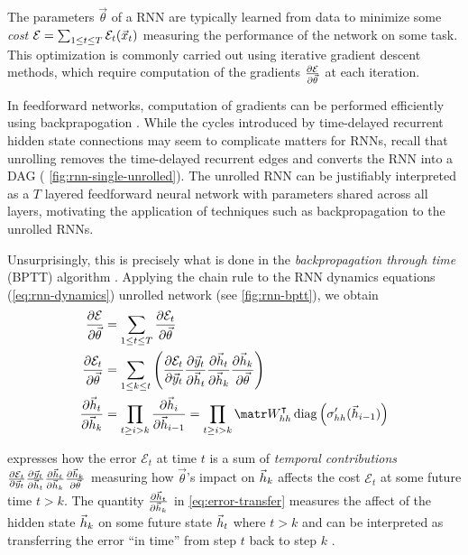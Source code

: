 
The parameters $\vec{\theta}$ of a RNN are typically learned from data to
minimize some \emph{cost} $\mathcal{E} = \sum_{1 \leq t \leq T} \mathcal{E}_t(\vec{x}_t)$
measuring the performance of the network on some task. This optimization is
commonly carried out using iterative gradient descent methods, which require
computation of the gradients $\frac{\partial \mathcal{E}}{\partial \vec{\theta}}$ at each
iteration.

In feedforward networks, computation of gradients can be performed efficiently
using backprapogation
\citep{bryson1963optimal,linnainmaa1970representation,rumelhart1988learning}.
While the cycles introduced by time-delayed recurrent hidden state connections
may seem to complicate matters for RNNs, recall that unrolling removes the
time-delayed recurrent edges and converts the RNN into a DAG (\eg
\vref{fig:rnn-single-unrolled}). The unrolled RNN can be justifiably
interpreted as a $T$ layered feedforward neural network with parameters shared
across all layers, motivating the application of techniques such as
backpropagation to the unrolled RNNs.

Unsurprisingly, this is precisely what is done in the \emph{backpropagation
through time} (BPTT) algorithm \citep{goller1996learning}. Applying the
chain rule to the RNN dynamics equations (\vref{eq:rnn-dynamics})
unrolled network (see \cref{fig:rnn-bptt}), we obtain
\begin{align}
  \frac{\pd \mathcal{E}}{\pd \vec{\theta}} &= \sum_{1 \leq t \leq T} \frac{\pd \mathcal{E}_t}{\pd \vec{\theta}} \label{eq:err-total}\\
    \frac{\pd \mathcal{E}_t}{\pd \vec{\theta}} &= \sum_{1 \leq k \leq t} \left(
        \frac{\pd \mathcal{E}_t}{\pd \y_t}
        \frac{\pd \y_t}{\pd \h_t}
        \frac{\pd \h_t}{\pd \h_k}
        \frac{\pd \h_k}{\pd \vec{\theta}}
    \right) \label{eq:error-t}\\
    \frac{\pd \h_t}{\pd \h_k} &=
    \prod_{t \geq i > k} \frac{\pd \h_i}{\pd \h_{i-1}}
    = \prod_{t \geq i > k} \W_{hh}^\tp \diag \left( \sigma_{hh}'( \h_{i-1} ) \right)
    \label{eq:error-transfer}
\end{align}

 expresses how the error $\mathcal{E}_t$ at time $t$ is a sum
of \emph{temporal contributions} $
\frac{\partial \mathcal{E}_t}{\partial \vec{y}_t}
\frac{\partial \vec{y}_t}{\partial \vec{h}_t}
\frac{\partial \vec{h}_t}{\partial \vec{h}_k}
\frac{\partial \vec{h}_k}{\partial \vec{\theta}}$
measuring how $\vec{\theta}$'s impact on $\vec{h}_k$ affects the cost
$\mathcal{E}_t$ at some future time $t > k$. The quantity
$\frac{\partial \vec{h}_t}{\partial \vec{h}_k}$ in \cref{eq:error-transfer} measures the affect of
the hidden state $\vec{h}_k$ on some future state $\vec{h}_t$ where $t > k$ and can be
interpreted as transferring the error ``in time'' from step $t$ back to step
$k$ \citep{Pascanu2012}.

